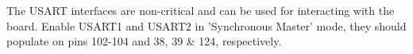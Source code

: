 The USART interfaces are non-critical and can be used for interacting with the board.
Enable USART1 and USART2 in 'Synchronous Master' mode, they should populate on pins 102-104 and 38, 39 \& 124, respectively.